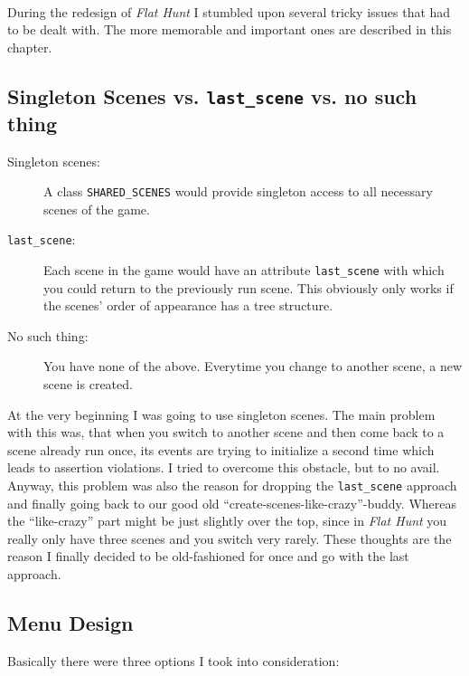 
\paragraph{}
During the redesign of \emph{Flat Hunt} I stumbled upon several tricky issues that had to be dealt with. The more memorable and important ones are described in this chapter.

\subsection{\label{scenes_decision}Singleton Scenes vs. \texttt{last\_scene} vs. no such thing}
\begin{description}
  \item[Singleton scenes:] A class \texttt{SHARED\_SCENES} would provide singleton access to all necessary scenes of the game.
  \item[\texttt{last\_scene}:] Each scene in the game would have an attribute \texttt{last\_scene} with which you could return to the previously run scene. This obviously only works if the scenes' order of appearance has a tree structure.
  \item[No such thing:] You have none of the above. Everytime you change to another scene, a new scene is created.
\end{description}
At the very beginning I was going to use singleton scenes. The main problem with this was, that when you switch to another scene and then come back to a scene already run once, its events are trying to initialize a second time which leads to assertion violations. I tried to overcome this obstacle, but to no avail. Anyway, this problem was also the reason for dropping the \texttt{last\_scene} approach and finally going back to our good old ``create-scenes-like-crazy''-buddy. Whereas the ``like-crazy'' part might be just slightly over the top, since in \emph{Flat Hunt} you really only have three scenes and you switch very rarely. These thoughts are the reason I finally decided to be old-fashioned for once and go with the last approach.

\subsection{Menu Design}
Basically there were three options I took into consideration:

